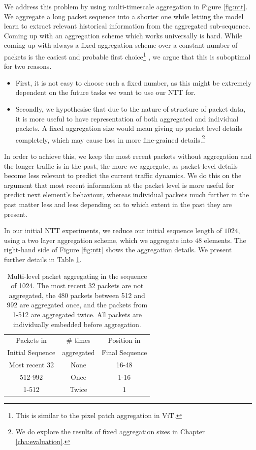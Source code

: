 We address this problem by using multi-timescale aggregation in Figure \ref{fig:ntt}. We aggregate a long packet sequence into a shorter one while letting the model learn to extract relevant historical information from the aggregated sub-sequence.
Coming up with an aggregation scheme which works universally is hard. While coming up with always a fixed aggregation scheme over a constant number of packets is the easiest and probable first choice\footnote{This is similar to the pixel patch aggregation in ViT\cite{dosovitskiyImageWorth16x162021}.}
, we argue that this is suboptimal for two reasons.
\begin{itemize}
\item First, it is not easy to choose such a fixed number, as this might be extremely dependent on the future tasks we want to use our NTT for.
\item Secondly, we hypothesise that due to the nature of structure of packet data, it is more useful to have representation of both aggregated and individual packets.  A fixed aggregation size would mean giving up packet level details completely, which may cause loss in more fine-grained details.\footnote{We do explore the results of fixed aggregation sizes in Chapter \ref{cha:evaluation}.}
\end{itemize}
 
In order to achieve this, we keep the most recent packets without aggregation and the longer traffic is in the past, the more we aggregate, as packet-level details become less relevant to predict the current traffic dynamics. We do this on the argument that most recent information at the packet level is more useful for predict next element's behaviour, whereas individual packets much further in the past matter less and less depending on to which extent in the past they are present.


In our initial NTT experiments, we reduce our initial sequence length of $1024$, using a two layer aggregation scheme, which we aggregate into $48$ elements. The right-hand side of Figure \ref{fig:ntt} shows the aggregation details. We present further details in Table \ref{des:table1}.

\begin{table}[htbp]
\centering
\begin{tabular}{ c   c   c  }
\toprule
Packets in & \# times   & Position in \\
Initial Sequence & aggregated & Final Sequence \\
\midrule
Most recent 32 & None & 16-48 \\
512-992 & Once & 1-16 \\
1-512 & Twice & 1 \\
\bottomrule
\end{tabular}
\caption{Multi-level packet aggregating in the sequence of 1024. The most recent 32 packets are not aggregated, the 480 packets between 512 and 992 are aggregated once, and the packets from 1-512 are aggregated twice. All packets are individually embedded before aggregation.}
\label{des:table1}
\end{table}


